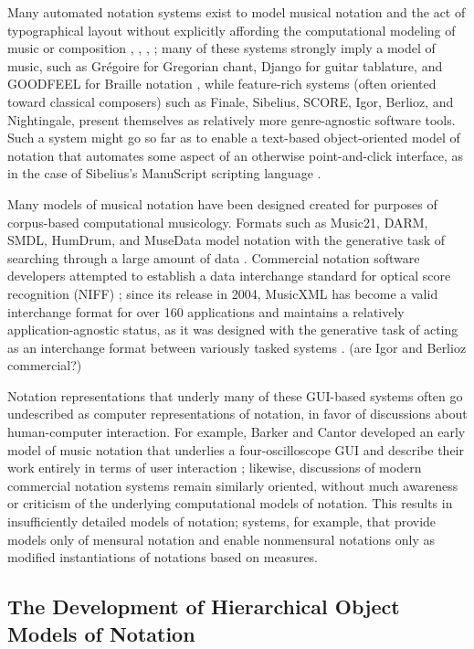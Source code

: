 \documentclass{article}
\begin{document}
Many automated notation systems exist to model musical notation and the act of
typographical layout without explicitly affording the computational modeling of
music or composition \cite{Smith:1972mw}, \cite{Nienhuys:2003ve},
\cite{Hoos:1998bd}, \cite{hamel1noteability}; many of these systems strongly
imply a model of music, such as Gr\'{e}goire for Gregorian chant, Django for
guitar tablature, and GOODFEEL for Braille notation \cite{2006}, while
feature-rich systems (often oriented toward classical composers) such as
Finale, Sibelius, SCORE, Igor, Berlioz, and Nightingale, present themselves as
relatively more genre-agnostic software tools. Such a system might go so far as
to enable a text-based object-oriented model of notation that automates some
aspect of an otherwise point-and-click interface, as in the case of Sibelius's
ManuScript scripting language \cite{Technology:qc}. 

Many models of musical notation have been designed created for purposes of
corpus-based computational musicology. Formats such as Music21, DARM, SMDL,
HumDrum, and MuseData model notation with the generative task of searching
through a large amount of data \cite{Selfridge-Field:1997ud}. Commercial
notation software developers attempted to establish a data interchange standard
for optical score recognition (NIFF) \cite{niff1995niff}; since its release in
2004, MusicXML has become a valid interchange format for over 160 applications
and maintains a relatively application-agnostic status, as it was designed with
the generative task of acting as an interchange format between variously tasked
systems \cite{Good:2001if}. (are Igor and Berlioz commercial?)

Notation representations that underly many of these GUI-based systems often go
undescribed as computer representations of notation, in favor of discussions
about human-computer interaction. For example, Barker and Cantor developed an
early model of music notation that underlies a four-oscilloscope GUI and
describe their work entirely in terms of user interaction
\cite{cantor1971computer}; likewise, discussions of modern commercial notation
systems remain similarly oriented, without much awareness or criticism of the
underlying computational models of notation. This results in insufficiently
detailed models of notation; systems, for example, that provide models only of
mensural notation and enable nonmensural notations only as modified
instantiations of notations based on measures.

\subsection{The Development of Hierarchical Object Models of Notation}
\end{document}
